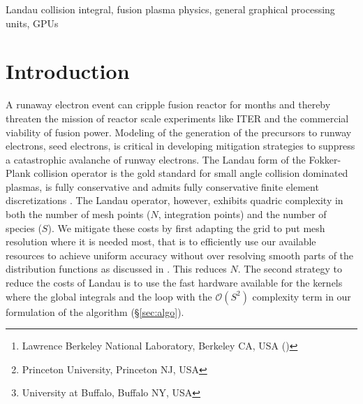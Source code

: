 \documentclass[12pt]{siamart}
\title{{\TheTitle}}
\author{
  Mark F. Adams\thanks{Lawrence Berkeley National Laboratory, Berkeley CA, USA (\email{mfadams@lbl.gov})}
 \and
 Dylan Brennan \thanks{Princeton University, Princeton NJ, USA}
 \and
  Matthew G. Knepley\thanks{ University at Buffalo, Buffalo NY, USA}
}
\newcommand{\Order}[1]{\ensuremath{\mathcal{O}(#1)}}    %
\begin{document}
\date{}

\maketitle

\begin{abstract}
Runaway electron (RE) events are catastrophic to tokamak experimental reactors and pose an existential threat to the development of commercial fusion reactors.
We seek to understand the generation of ``seed" electrons, which are the precursors of REs, with accurate velocity space models using fully conserving, structure preserving, discretizations of the Fokker-Plank collision operator in Landau form.
We continue the development of a high-performance implementation of these discretizations with verification studies and the extension of earlier work on vectorization to general graphical processing units (GPUs).
We investigate seed electron generation as a function of exogenous parameters such as quench rates, heavy ion injection rates from common mitigation strategies, plasma temperature, etc.
\end{abstract}


\begin{keywords}
  Landau collision integral, fusion plasma physics, general graphical processing units, GPUs
\end{keywords}

\section{Introduction}

A runaway electron event can cripple fusion reactor for months and thereby threaten the mission of reactor scale experiments like ITER and the commercial viability of fusion power.
Modeling of the generation of the precursors to runway electrons, seed electrons, is critical in developing mitigation strategies to suppress a catastrophic avalanche of runway electrons.
The Landau form of the Fokker-Plank collision operator is the gold standard for small angle collision dominated plasmas, is fully conservative and admits fully conservative finite element discretizations \cite{Hirvijoki2016,AdamsHirvijokiKnepleyBrownIsaacMills2017}.
The Landau operator, however, exhibits quadric complexity in both the number of mesh points ($N$, integration points) and the number of species ($S$).
We mitigate these costs by first adapting the grid to put mesh resolution where it is needed most, that is to efficiently use our available resources to achieve uniform accuracy without over resolving smooth parts of the distribution functions as discussed in \cite{AdamsHirvijokiKnepleyBrownIsaacMills2017}.
This reduces $N$.
The second strategy to reduce the costs of Landau is to use the fast hardware available for the kernels where the global integrals and the loop with the $\Order{S^2}$ complexity term in our formulation of the algorithm (\S\ref{sec:algo}).
\end{document}
